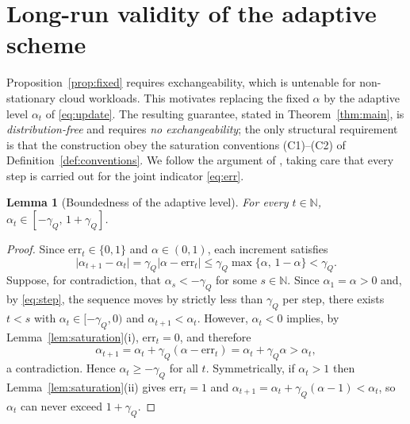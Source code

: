 \documentclass[11pt]{article}
\newtheorem{lemma}[theorem]{Lemma}
\theoremstyle{definition}
\theoremstyle{remark}
\newcommand{\N}{\mathbb{N}}
\newcommand{\err}{\mathrm{err}}
\begin{document}
\section{Long-run validity of the adaptive scheme}
\label{sec:adaptive}

Proposition~\ref{prop:fixed} requires exchangeability, which is untenable for
non-stationary cloud workloads. This motivates replacing the fixed $\alpha$ by
the adaptive level $\alpha_t$ of \eqref{eq:update}. The resulting guarantee,
stated in Theorem~\ref{thm:main}, is \emph{distribution-free} and requires
\emph{no exchangeability}; the only structural requirement is that the
construction obey the saturation conventions (C1)--(C2) of
Definition~\ref{def:conventions}. We follow
the argument of \cite{gibbs2021}, taking care that every step is carried out
for the joint indicator \eqref{eq:err}.

\begin{lemma}[Boundedness of the adaptive level]
\label{lem:bounded}
For every $t\in\N$, $\alpha_t\in[-\gamma_Q,\,1+\gamma_Q]$.
\end{lemma}

\begin{proof}
Since $\err_t\in\{0,1\}$ and $\alpha\in(0,1)$, each increment satisfies
\begin{equation}
  \lvert\alpha_{t+1}-\alpha_t\rvert
  =\gamma_Q\lvert\alpha-\err_t\rvert
  \le\gamma_Q\max\{\alpha,\,1-\alpha\}
  <\gamma_Q .
  \label{eq:step}
\end{equation}
Suppose, for contradiction, that $\alpha_s<-\gamma_Q$ for some $s\in\N$. Since
$\alpha_1=\alpha>0$ and, by \eqref{eq:step}, the sequence moves by strictly
less than $\gamma_Q$ per step, there exists $t<s$ with
$\alpha_t\in[-\gamma_Q,0)$ and $\alpha_{t+1}<\alpha_t$. However, $\alpha_t<0$
implies, by Lemma~\ref{lem:saturation}(i), $\err_t=0$, and therefore
\[
  \alpha_{t+1}=\alpha_t+\gamma_Q(\alpha-\err_t)=\alpha_t+\gamma_Q\alpha>\alpha_t,
\]
a contradiction. Hence $\alpha_t\ge-\gamma_Q$ for all $t$. Symmetrically, if
$\alpha_t>1$ then Lemma~\ref{lem:saturation}(ii) gives $\err_t=1$ and
$\alpha_{t+1}=\alpha_t+\gamma_Q(\alpha-1)<\alpha_t$, so $\alpha_t$ can never
exceed $1+\gamma_Q$.
\end{proof}
\end{document}
